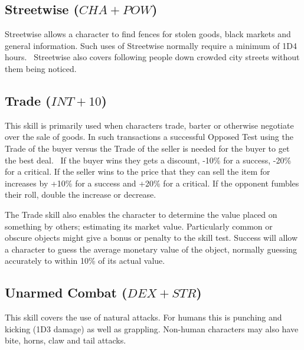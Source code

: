 \subsection{Streetwise ($CHA+POW$)}
Streetwise allows a character to find fences for stolen goods, black markets and general information. Such uses of Streetwise normally require a minimum of 1D4 hours.  Streetwise also covers following people down crowded city streets without them being noticed.

\subsection{Trade ($INT+10$)}
\label{ssec:trade}
This skill is primarily used when characters trade, barter or otherwise negotiate over the sale of goods. In such transactions a successful Opposed Test using the Trade of the buyer versus the Trade of the seller is needed for the buyer to get the best deal.  If the buyer wins they gets a discount, -10\% for a success, -20\% for a critical. If the seller wins to the price that they can sell the item for increases by +10\% for a success and +20\% for a critical. If the opponent fumbles their roll, double the increase or decrease.

The Trade skill also enables the character to determine the value placed on something by others; estimating its market value. Particularly common or obscure objects might give a bonus or penalty to the skill test. Success will allow a character to guess the average monetary value of the object, normally guessing accurately to within 10\% of its actual value.  


\subsection{Unarmed Combat ($DEX+STR$)}
This skill covers the use of natural attacks. For humans this is punching and kicking (1D3 damage) as well as grappling. Non-human characters may also have bite, horns, claw and tail attacks. 


